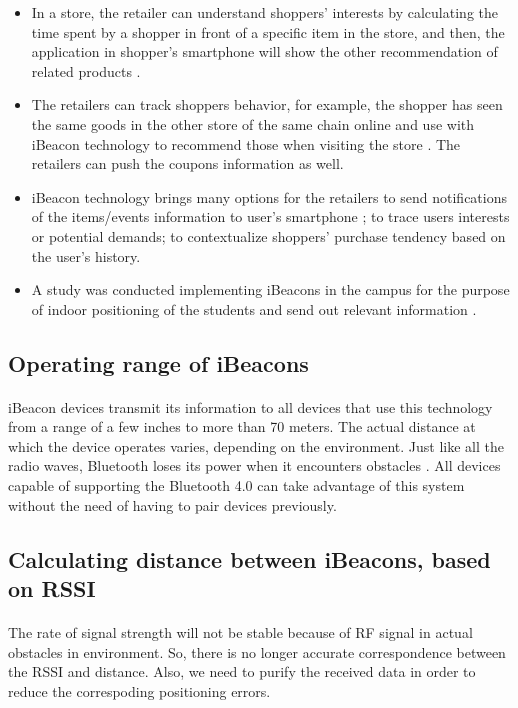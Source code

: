 \documentclass[12pt]{article}
\begin{document}
\begin{itemize}
	\item In a store, the retailer can understand shoppers’ interests by calculating the time spent by a shopper in front of a specific item in the store, and then, the application in shopper’s smartphone will show the other recommendation of related products \cite{beacons}.

\item The retailers can track shoppers behavior, for example, the shopper has seen the same goods in the other store of the same chain online and use with iBeacon technology to recommend those when visiting the store \cite{beacons}. The retailers can push the coupons information as well.

\item iBeacon technology brings many options for the retailers to send notifications of the items/events information to user's smartphone \cite{beacons}; to trace users interests or potential demands; to contextualize shoppers’ purchase tendency based on the user's history.

\item{} A study was conducted implementing iBeacons in the campus for the purpose of indoor positioning of the students and send out relevant information \cite{campus}.

\end{itemize}

\subsection{Operating range of iBeacons}
\paragraph{}iBeacon devices transmit its information to all devices that use this technology from a range of a few inches to more than 70 meters. The actual distance at which the device operates varies, depending on the environment. Just like all the radio waves, Bluetooth loses its power when it encounters obstacles \cite{demo}. All devices capable of supporting the Bluetooth 4.0 can take advantage of this system without the need of having to pair devices previously.

\subsection{Calculating distance between iBeacons, based on RSSI}
\paragraph{}The rate of signal strength will not be stable because of RF signal in actual obstacles in environment. So, there is no longer accurate correspondence between the RSSI and distance. Also, we need to purify the received data in order to reduce the correspoding positioning errors.
\end{document}
